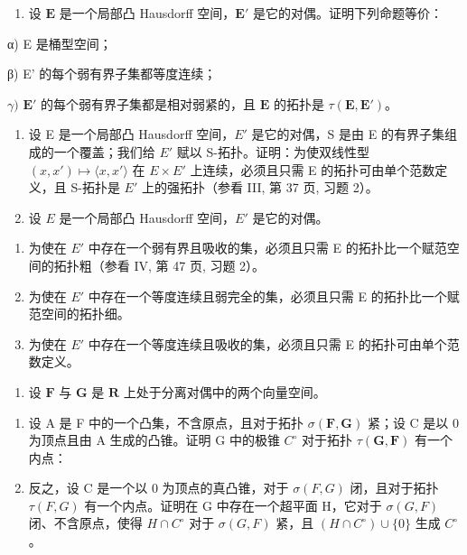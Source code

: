 \begin{enumerate}
\def\labelenumi{\arabic{enumi})}
\setcounter{enumi}{9}
\tightlist
\item
  设 \(\mathbf{E}\) 是一个局部凸 Hausdorff 空间，\(\mathbf{E}'\) 是它的对偶。证明下列命题等价：
\end{enumerate}

α) E 是桶型空间；

β) E' 的每个弱有界子集都等度连续；

\(\gamma)\) \(\mathbf{E}'\) 的每个弱有界子集都是相对弱紧的，且 \(\mathbf{E}\) 的拓扑是 \(\tau (\mathbf{E},\mathbf{E}')\)。

\begin{enumerate}
\def\labelenumi{\arabic{enumi})}
\setcounter{enumi}{10}
\item
  设 E 是一个局部凸 Hausdorff 空间，\(E'\) 是它的对偶，S 是由 E 的有界子集组成的一个覆盖；我们给 \(E'\) 赋以 S-拓扑。证明：为使双线性型 \((x, x') \mapsto \langle x, x' \rangle\) 在 \(E \times E'\) 上连续，必须且只需 E 的拓扑可由单个范数定义，且 S-拓扑是 \(E'\) 上的强拓扑（参看 III, 第 37 页, 习题 2）。
\item
  设 \(E\) 是一个局部凸 Hausdorff 空间，\(E'\) 是它的对偶。
\end{enumerate}

\begin{enumerate}
\def\labelenumi{\alph{enumi})}
\item
  为使在 \(E'\) 中存在一个弱有界且吸收的集，必须且只需 E 的拓扑比一个赋范空间的拓扑粗（参看 IV, 第 47 页, 习题 2）。
\item
  为使在 \(E'\) 中存在一个等度连续且弱完全的集，必须且只需 E 的拓扑比一个赋范空间的拓扑细。
\item
  为使在 \(E'\) 中存在一个等度连续且吸收的集，必须且只需 E 的拓扑可由单个范数定义。
\end{enumerate}

\begin{enumerate}
\def\labelenumi{\arabic{enumi})}
\setcounter{enumi}{12}
\tightlist
\item
  设 \(\mathbf{F}\) 与 \(\mathbf{G}\) 是 \(\mathbf{R}\) 上处于分离对偶中的两个向量空间。
\end{enumerate}

\begin{enumerate}
\def\labelenumi{\alph{enumi})}
\item
  设 A 是 F 中的一个凸集，不含原点，且对于拓扑 \(\sigma(\mathbf{F}, \mathbf{G})\) 紧；设 C 是以 0 为顶点且由 A 生成的凸锥。证明 G 中的极锥 \(C^{\circ}\) 对于拓扑 \(\tau(\mathbf{G}, \mathbf{F})\) 有一个内点：
\item
  反之，设 C 是一个以 0 为顶点的真凸锥，对于 \(\sigma(F, G)\) 闭，且对于拓扑 \(\tau(F, G)\) 有一个内点。证明在 G 中存在一个超平面 H，它对于 \(\sigma(G, F)\) 闭、不含原点，使得 \(H \cap C^{\circ}\) 对于 \(\sigma(G, F)\) 紧，且 \((H \cap C^{\circ}) \cup \{0\}\) 生成 \(C^{\circ}\)。
\end{enumerate}

